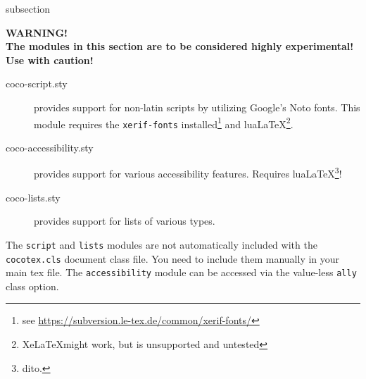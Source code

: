 \begin{heading}{subsection}
\end{heading}

\textbf{WARNING!\\
  The modules in this section are to be considered highly experimental!\\
  Use with caution!}

\begin{description}
\item[\ttfamily coco-script.sty] provides support for non-latin scripts by utilizing Google's Noto fonts. This module requires the \lstinline{xerif-fonts} installed\footnote{see \url{https://subversion.le-tex.de/common/xerif-fonts/}} and lua\LaTeX\footnote{Xe\LaTeX might work, but is unsupported and untested}.
\item[\ttfamily coco-accessibility.sty] provides support for various accessibility features. Requires {lua\LaTeX}\footnote{dito.}!
\item[\ttfamily coco-lists.sty] provides support for lists of various types.
\end{description}

The \lstinline{script} and \lstinline{lists} modules are not
automatically included with the \lstinline{cocotex.cls} document class
file. You need to include them manually in your main tex file. The
\lstinline{accessibility} module can be accessed via the value-less
\lstinline{ally} class option.
